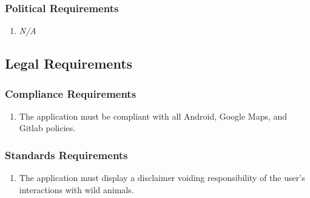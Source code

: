 \documentclass[]{article}
\begin{document}
\cbstart
\subsubsection{Political Requirements}
\label{ssub:political_requirements}
\begin{enumerate}[{CP}2. ]
	\item \emph{N/A}
\end{enumerate}
\cbend


\subsection{Legal Requirements}
\label{sub:legal_requirements}

\subsubsection{Compliance Requirements}
\label{ssub:compliance_requirements}
\begin{enumerate}[{LR}1. ]
	\item The application must be compliant with all Android, Google Maps, and Gitlab policies.
\end{enumerate}

\subsubsection{Standards Requirements}
\label{ssub:standards_requirements}
\begin{enumerate}[{LR}2. ]
	\item The application must display a disclaimer voiding responsibility of the user's interactions with wild animals.
\end{enumerate}




\newpage
\end{document}
